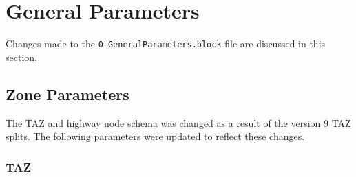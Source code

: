 \documentclass[
  letterpaper,
  DIV=11,
  numbers=noendperiod]{scrreprt}
\begin{document}

\hypertarget{general-parameters}{%
\chapter{General Parameters}\label{general-parameters}}

Changes made to the \texttt{0\_GeneralParameters.block} file are
discussed in this section.

\hypertarget{zone-parameters}{%
\section{Zone Parameters}\label{zone-parameters}}

The TAZ and highway node schema was changed as a result of the version 9
TAZ splits. The following parameters were updated to reflect these
changes.

\hypertarget{taz}{%
\subsection{TAZ}\label{taz}}
\end{document}
